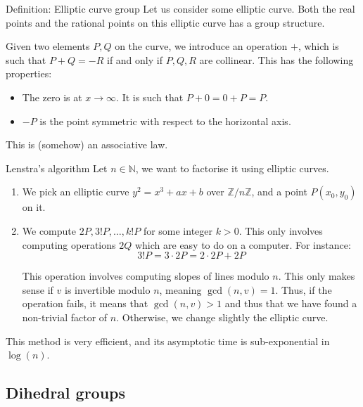 \documentclass[a4paper]{article}
\begin{document}
\begin{parag}{Definition: Elliptic curve group}
    Let us consider some elliptic curve. Both the real points and the rational points on this elliptic curve has a group structure.

    Given two elements $P, Q$ on the curve, we introduce an operation $+$, which is such that $P + Q = -R$ if and only if $P, Q, R$ are collinear. This has the following properties:
    \begin{itemize}[left=0pt]
        \item The zero is at $x \to \infty$. It is such that $P + 0 = 0 + P = P$.
        \item $-P$ is the point symmetric with respect to the horizontal axis.
    \end{itemize}
    
    This is (somehow) an associative law.
\end{parag}

\begin{parag}{Lenstra's algorithm}
    Let $n \in \mathbb{N}$, we want to factorise it using elliptic curves.

    \begin{enumerate}[left=0pt]
        \item We pick an elliptic curve $y^2 = x^3 + ax + b$ over $\mathbb{Z}/n\mathbb{Z}$, and a point $P\left(x_0, y_0\right)$ on it.
        \item We compute $2P, 3! P, \ldots, k! P$ for some integer $k > 0$. This only involves computing operations $2Q$ which are easy to do on a computer. For instance: 
        \[3! P = 3 \cdot  2P = 2\cdot 2P + 2P\]
        
        This operation involves computing slopes of lines modulo $n$. This only makes sense if $v$ is invertible modulo $n$, meaning $\gcd\left(n, v\right) = 1$. Thus, if the operation fails, it means that $\gcd\left(n, v\right) > 1$ and thus that we have found a non-trivial factor of $n$. Otherwise, we change slightly the elliptic curve.
    \end{enumerate}
    
    This method is very efficient, and its asymptotic time is sub-exponential in $\log\left(n\right)$.
\end{parag}

\subsection{Dihedral groups}
\end{document}

